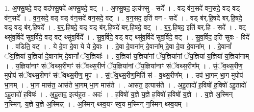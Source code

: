 \documentclass[17pt]{extarticle}
\begin{document}
1. अ॒फ्सु॒षदे॒ वड् वड॑फ्सु॒षदे॑ अफ्सु॒षदे॒ वट् । . अ॒फ्सु॒षद॒ इत्य॑फ्सु - सदे᳚ । . वड् व॑न॒सदे॑ वन॒सदे॒ वड् वड् व॑न॒सदे᳚ । . व॒न॒सदे॒ वड् वड् व॑न॒सदे॑ वन॒सदे॒ वट् । . व॒न॒सद॒ इति॑ वन - सदे᳚ । . वड् ब॑र्.हि॒षदे॑ बर्.हि॒षदे॒ वड् वड् ब॑र्.हि॒षदे᳚ । . ब॒र्॒.हि॒षदे॒ वड् वड् ब॑र्.हि॒षदे॑ बर्.हि॒षदे॒ वट् । . ब॒र्॒.हि॒षद॒ इति॑ बर्.हि - सदे᳚ । . वट् थ्सु॑व॒र्विदे॑ सुव॒र्विदे॒ वड् वट् थ्सु॑व॒र्विदे᳚ । . सु॒व॒र्विदे॒ वड् वट् थ्सु॑व॒र्विदे॑ सुव॒र्विदे॒ वट् । . सु॒व॒र्विद॒ इति॑ सुवः - विदे᳚ । . वडिति॒ वट् । . ये दे॒वा दे॒वा ये ये दे॒वाः । . दे॒वा दे॒वाना᳚म् दे॒वाना᳚म् दे॒वा दे॒वा दे॒वाना᳚म् । . दे॒वानां᳚ ॅय॒ज्ञिया॑ य॒ज्ञिया॑ दे॒वाना᳚म् दे॒वानां᳚ ॅय॒ज्ञियाः᳚ । . य॒ज्ञिया॑ य॒ज्ञिया॑नां ॅय॒ज्ञिया॑नां ॅय॒ज्ञिया॑ य॒ज्ञिया॑ य॒ज्ञिया॑नाम् । . य॒ज्ञिया॑नाꣳ संॅवथ्स॒रीणꣳ॑ संॅवथ्स॒रीणं॑ ॅय॒ज्ञिया॑नां ॅय॒ज्ञिया॑नाꣳ संॅवथ्स॒रीण᳚म् । . सं॒ॅव॒थ्स॒रीण॒ मुपोप॑ संॅवथ्स॒रीणꣳ॑ संॅवथ्स॒रीण॒ मुप॑ । . सं॒ॅव॒थ्स॒रीण॒मिति॑ सं - व॒थ्स॒रीण᳚म् । . उप॑ भा॒गम् भा॒ग मुपोप॑ भा॒गम् । . भा॒ग मास॑त॒ आस॑ते भा॒गम् भा॒ग मास॑ते । . आस॑त॒ इत्यास॑ते । . अ॒हु॒तादो॑ ह॒विषो॑ ह॒विषो॑ ऽहु॒तादो॑ ऽहु॒तादो॑ ह॒विषः॑ । . अ॒हु॒ताद॒ इत्य॑हुत - अदः॑ । . ह॒विषो॑ य॒ज्ञे य॒ज्ञे ह॒विषो॑ ह॒विषो॑ य॒ज्ञे । . य॒ज्ञे अ॒स्मिन् न॒स्मिन्. य॒ज्ञे य॒ज्ञे अ॒स्मिन्न् । . अ॒स्मिन् थ्स्व॒यꣳ स्व॒य म॒स्मिन् न॒स्मिन् थ्स्व॒यम् । \newline
\end{document}
